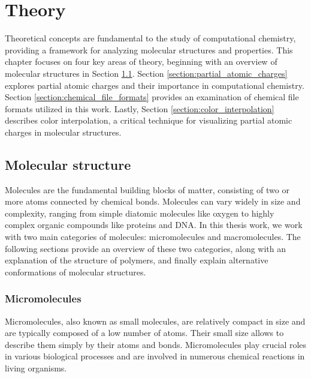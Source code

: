 \documentclass[
  digital,     %
  oneside,     %
  nosansbold,  %
  nocolorbold, %
  lof,         %
  lot,         %
]{fithesis4}
\begin{document}
\newpage
\chapter{Theory}
\label{chapter:theory}

Theoretical concepts are fundamental to the study of computational chemistry, providing a framework for analyzing molecular structures and properties. This chapter focuses on four key areas of theory, beginning with an overview of molecular structures in Section \ref{section:molecular_structure}. Section \ref{section:partial_atomic_charges} explores partial atomic charges and their importance in computational chemistry. Section \ref{section:chemical_file_formats} provides an examination of chemical file formats utilized in this work. Lastly, Section \ref{section:color_interpolation} describes color interpolation, a critical technique for visualizing partial atomic charges in molecular structures.

\section{Molecular structure}
\label{section:molecular_structure}


Molecules are the fundamental building blocks of matter, consisting of two or more atoms connected by chemical bonds. Molecules can vary widely in size and complexity, ranging from simple diatomic molecules like oxygen to highly complex organic compounds like proteins and DNA. In this thesis work, we work with two main categories of molecules: micromolecules and macromolecules. The following sections provide an overview of these two categories, along with an explanation of the structure of polymers, and finally explain alternative conformations of molecular structures.

\subsection{Micromolecules}


Micromolecules, also known as small molecules, are relatively compact in size and are typically composed of a low number of atoms. Their small size allows to describe them simply by their atoms and bonds. Micromolecules play crucial roles in various biological processes and are involved in numerous chemical reactions in living organisms. 
\end{document}
